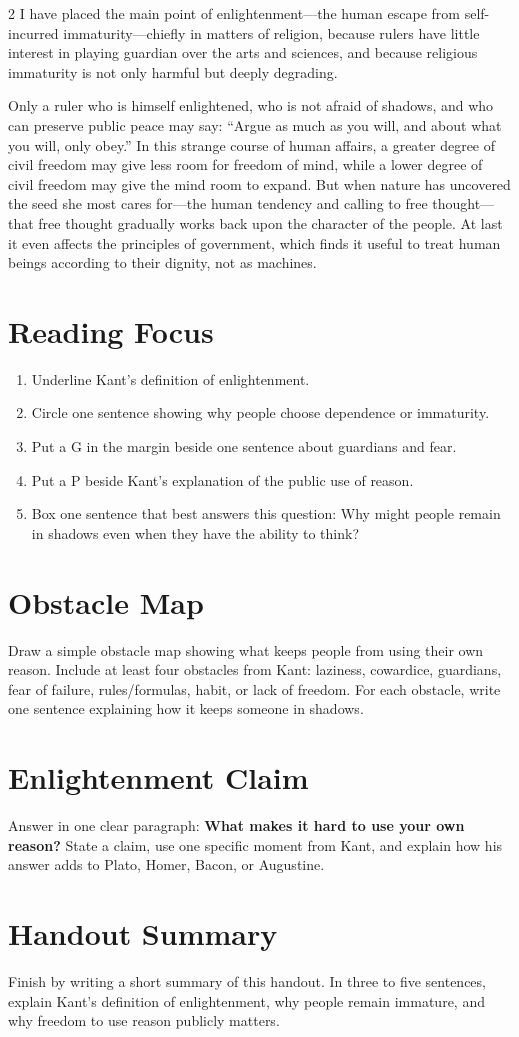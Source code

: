 \documentclass[12pt]{article}
\begin{document}
\begin{multicols}{2}
I have placed the main point of enlightenment---the human escape from self-incurred immaturity---chiefly in matters of religion, because rulers have little interest in playing guardian over the arts and sciences, and because religious immaturity is not only harmful but deeply degrading.

Only a ruler who is himself enlightened, who is not afraid of shadows, and who can preserve public peace may say: ``Argue as much as you will, and about what you will, only obey.'' In this strange course of human affairs, a greater degree of civil freedom may give less room for freedom of mind, while a lower degree of civil freedom may give the mind room to expand. But when nature has uncovered the seed she most cares for---the human tendency and calling to free thought---that free thought gradually works back upon the character of the people. At last it even affects the principles of government, which finds it useful to treat human beings according to their dignity, not as machines.

\section*{Reading Focus}
\begin{enumerate}[leftmargin=*, itemsep=0.2em]
\item Underline Kant's definition of enlightenment.
\item Circle one sentence showing why people choose dependence or immaturity.
\item Put a G in the margin beside one sentence about guardians and fear.
\item Put a P beside Kant's explanation of the public use of reason.
\item Box one sentence that best answers this question: Why might people remain in shadows even when they have the ability to think?
\end{enumerate}

\section*{Obstacle Map}
Draw a simple obstacle map showing what keeps people from using their own reason. Include at least four obstacles from Kant: laziness, cowardice, guardians, fear of failure, rules/formulas, habit, or lack of freedom. For each obstacle, write one sentence explaining how it keeps someone in shadows.

\section*{Enlightenment Claim}
Answer in one clear paragraph: \textbf{What makes it hard to use your own reason?} State a claim, use one specific moment from Kant, and explain how his answer adds to Plato, Homer, Bacon, or Augustine.

\section*{Handout Summary}
Finish by writing a short summary of this handout. In three to five sentences, explain Kant's definition of enlightenment, why people remain immature, and why freedom to use reason publicly matters.

\end{multicols}
\end{document}
